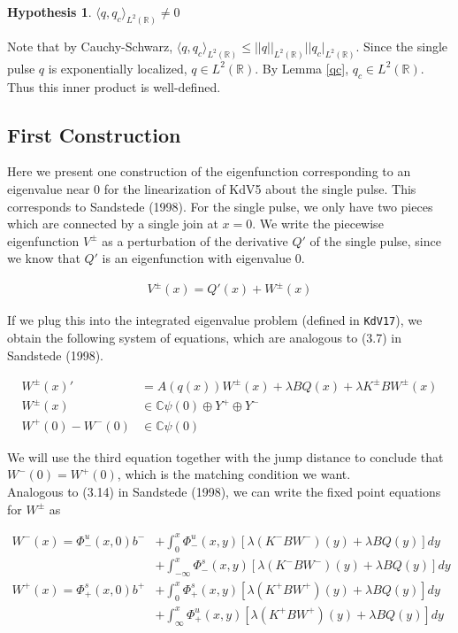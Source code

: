 \documentclass[12pt]{article}
\def\R{{\mathbb R}}
\def\C{{\mathbb C}}
\newtheorem{hypothesis}{Hypothesis}
\begin{document}
\begin{hypothesis}\label{qcIP}
$\langle q, q_c\rangle_{L^2(\R)} \neq 0$
\end{hypothesis}
Note that by Cauchy-Schwarz, $\langle q, q_c\rangle_{L^2(\R)} \leq ||q||_{L^2(\R)} ||q_c|_{L^2(\R)}$. Since the single pulse $q$ is exponentially localized, $q \in L^2(\R)$. By Lemma \ref{qc}, $q_c \in L^2(\R)$. Thus this inner product is well-defined.

\subsection*{First Construction}

Here we present one construction of the eigenfunction corresponding to an eigenvalue near 0 for the linearization of KdV5 about the single pulse. This corresponds to Sandstede (1998). For the single pulse, we only have two pieces which are connected by a single join at $x = 0$. We write the piecewise eigenfunction $V^\pm$ as a perturbation of the derivative $Q'$ of the single pulse, since we know that $Q'$ is an eigenfunction with eigenvalue 0. 

\begin{align*}
V^\pm(x) = Q'(x) + W^\pm(x)
\end{align*}

If we plug this into the integrated eigenvalue problem (defined in \texttt{KdV17}), we obtain the following system of equations, which are analogous to (3.7) in Sandstede (1998).

\begin{align*}
W^\pm(x)' &= A(q(x)) W^\pm(x) + \lambda B Q(x) + \lambda K^\pm B W^\pm(x) \\
W^\pm(x) &\in \C \psi(0) \oplus Y^+ \oplus Y^- \\
W^+(0) - W^-(0) &\in \C \psi(0) 
\end{align*}

We will use the third equation together with the jump distance to conclude that $W^-(0) = W^+(0)$, which is the matching condition we want.\\

Analogous to (3.14) in Sandstede (1998), we can write the fixed point equations for $W^\pm$ as

\begin{align*}
W^-(x) = \Phi^u_-(x, 0)b^- &+ \int_0^x \Phi^u_-(x, y)[\lambda (K^- B W^-)(y) + \lambda B Q(y) ] dy \\
&+ \int_{-\infty}^x \Phi^s_-(x, y)[\lambda (K^- B W^-)(y) + \lambda B Q(y) ] dy \\
W^+(x) = \Phi^s_+(x, 0)b^+ &+ \int_0^x \Phi^s_+(x, y)[\lambda (K^+ B W^+)(y) + \lambda B Q(y) ] dy \\
&+ \int_{\infty}^x \Phi^u_+(x, y)[\lambda (K^+ B W^+)(y) + \lambda B Q(y) ] dy
\end{align*}
\end{document}
